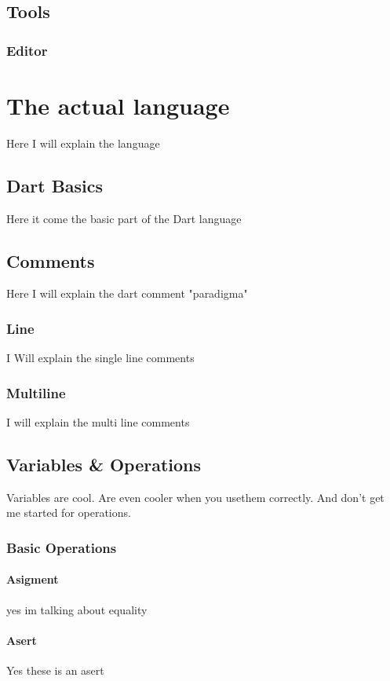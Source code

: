 \documentclass[10pt]{book}
\begin{document}
\section{Tools}
\subsection{Editor}

\chapter{The actual language}
Here I will explain the language

\section{Dart Basics}
Here it come the basic part of the Dart language

\section{Comments}
Here I will explain the dart comment "paradigma"
\subsection{Line}
I Will explain the single line comments
\subsection{Multiline}
I will explain the multi line comments

\section{Variables \& Operations}
Variables are cool. Are even cooler when you usethem correctly. And don't get me started for operations.

\subsection{Basic Operations}
\subsubsection{Asigment}
yes im talking about equality
\subsubsection{Asert}
Yes these is an asert 
\end{document}
